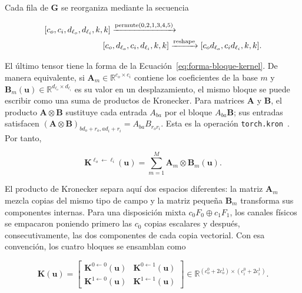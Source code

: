 Cada fila de \(\mathbf G\) se reorganiza mediante la secuencia

\begin{equation}
\begin{aligned}
&[c_o,c_i,d_{\ell_o},d_{\ell_i},k,k]
\xrightarrow{\operatorname{permute}(0,2,1,3,4,5)}\\
&\hspace{25mm}[c_o,d_{\ell_o},c_i,d_{\ell_i},k,k]
\xrightarrow{\operatorname{reshape}}
[c_od_{\ell_o},c_id_{\ell_i},k,k].
\end{aligned}
\label{eq:reshape-kernel-f01}
\end{equation}

El último tensor tiene la forma de la
Ecuación~\eqref{eq:forma-bloque-kernel}. De manera equivalente, si
\(\mathbf{A}_m\in\mathbb{R}^{c_o\times c_i}\) contiene los coeficientes de la
base \(m\) y \(\mathbf{B}_m(\mathbf u)\in
\mathbb{R}^{d_{\ell_o}\times d_{\ell_i}}\) es su valor en un desplazamiento,
el mismo bloque se puede escribir como una suma de productos de Kronecker.
Para matrices \(\mathbf A\) y \(\mathbf B\), el producto
\(\mathbf A\otimes\mathbf B\) sustituye cada entrada \(A_{ba}\) por el bloque
\(A_{ba}\mathbf B\); sus entradas satisfacen
\((\mathbf A\otimes\mathbf B)_{bd_o+r_o,ad_i+r_i}=A_{ba}B_{r_o r_i}\).
Esta es la operación \texttt{torch.kron}~\cite{pytorch_kron}. Por tanto,

\begin{equation}
    \mathbf{K}^{\ell_o\leftarrow\ell_i}(\mathbf u)
    =\sum_{m=1}^{M}\mathbf{A}_m\otimes\mathbf{B}_m(\mathbf u).
    \label{eq:kronecker-kernel-so2}
\end{equation}

El producto de Kronecker separa aquí dos espacios diferentes: la matriz
\(\mathbf A_m\) mezcla copias del mismo tipo de campo y la matriz pequeña
\(\mathbf B_m\) transforma sus componentes internas. Para una disposición
mixta \(c_0F_0\oplus c_1F_1\), los canales físicos se empacaron poniendo
primero las \(c_0\) copias escalares y después, consecutivamente, las dos
componentes de cada copia vectorial. Con esa convención, los cuatro bloques se
ensamblan como

\begin{equation}
    \mathbf{K}(\mathbf u)=
    \begin{bmatrix}
      \mathbf{K}^{0\leftarrow0}(\mathbf u) &
      \mathbf{K}^{0\leftarrow1}(\mathbf u)\\
      \mathbf{K}^{1\leftarrow0}(\mathbf u) &
      \mathbf{K}^{1\leftarrow1}(\mathbf u)
    \end{bmatrix}
    \in\mathbb{R}^{(c_o^0+2c_o^1)\times(c_i^0+2c_i^1)}.
    \label{eq:kernel-so2-por-bloques}
\end{equation}

